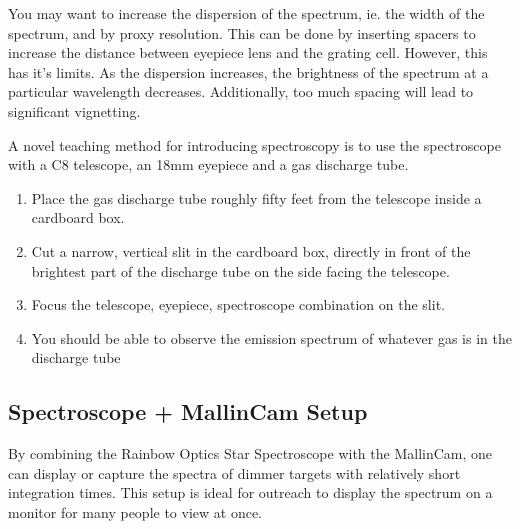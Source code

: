\documentclass[12pt,titlepage]{article}
\begin{document}
You may want to increase the dispersion of the spectrum, ie. the width of the spectrum, and by proxy resolution.
This can be done by inserting spacers to increase the distance between eyepiece lens and the grating cell.
However, this has it's limits. As the dispersion increases, the brightness of the spectrum at a particular wavelength decreases.
Additionally, too much spacing will lead to significant vignetting.
\par A novel teaching method for introducing spectroscopy is to use the spectroscope with a C8 telescope,
an 18mm eyepiece and a gas discharge tube.
\begin{enumerate}
	\item Place the gas discharge tube roughly fifty feet from the telescope inside a cardboard box.
	\item Cut a narrow, vertical slit in the cardboard box, directly in front of the brightest part of the
		discharge tube on the side facing the telescope.
	\item Focus the telescope, eyepiece, spectroscope combination on the slit.
	\item You should be able to observe the emission spectrum of whatever gas is in the discharge tube
\end{enumerate}

\subsection{Spectroscope + MallinCam Setup}
By combining the Rainbow Optics Star Spectroscope with the MallinCam, one can display or capture
the spectra of dimmer targets with relatively short integration times.
This setup is ideal for outreach to display the spectrum on a monitor for many people to view at once.
\end{document}
